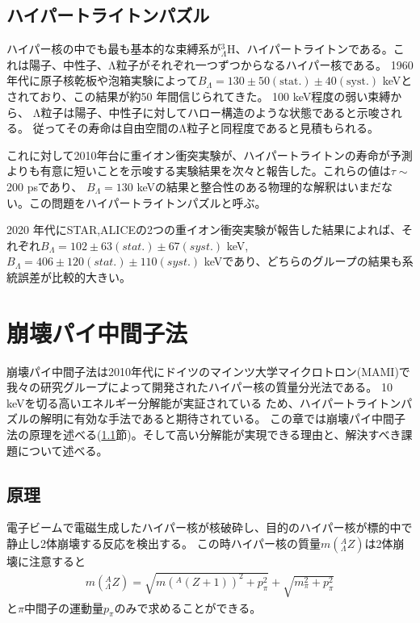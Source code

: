 \documentclass[a4paper,11pt,uplatex]{jsbook}
\begin{document}
\subsection{ハイパートライトンパズル}\label{sec:hypertriton puzzle}
ハイパー核の中でも最も基本的な束縛系が$^3_{\Lambda}\text{H}$、ハイパートライトンである。これは陽子、中性子、Λ粒子がそれぞれ一つずつからなるハイパー核である。
1960年代に原子核乾板や泡箱実験によって$B_{\Lambda} = 130 \pm 50(\text{stat.}) \pm 40(\text{syst.})$ keVとされており\cite{Juric}、この結果が約50 年間信じられてきた。
100 keV程度の弱い束縛から、%
Λ粒子は陽子、中性子に対してハロー構造のような状態であると示唆される。%
従ってその寿命は自由空間のΛ粒子と同程度であると見積もられる。

これに対して2010年台に重イオン衝突実験が、ハイパートライトンの寿命が予測よりも有意に短いことを示唆する実験結果を次々と報告した\cite{HI-1,HI-2,HI-3,HI-4}。これらの値は$\tau \sim$200 psであり、
$B_{\Lambda} = 130$ keVの結果と整合性のある物理的な解釈はいまだない。この問題をハイパートライトンパズルと呼ぶ。

2020 年代にSTAR,ALICEの2つの重イオン衝突実験が報告した結果によれば、それぞれ$B_{\Lambda}= 102 \pm 63(stat.) \pm 67(syst.)$ keV\cite{STAR}, 
$B_{\Lambda} = 406 \pm 120(stat.) \pm 110 (syst.)$ keV\cite{ALICE}であり、どちらのグループの結果も系統誤差が比較的大きい。\\

\section{崩壊パイ中間子法}
崩壊パイ中間子法は2010年代にドイツのマインツ大学マイクロトロン(MAMI)で我々の研究グループによって開発されたハイパー核の質量分光法である\cite{esserObservation4Hyperhydrogen2015}。
10 keVを切る高いエネルギー分解能が実証されている\cite{Schulz2015} ため、ハイパートライトンパズルの解明に有効な手法であると期待されている。
この章では崩壊パイ中間子法の原理を述べる(\ref{sec:dps principle}節)。そして高い分解能が実現できる理由と、解決すべき課題について述べる。
\subsection{原理}\label{sec:dps principle}
電子ビームで電磁生成したハイパー核が核破砕し、目的のハイパー核が標的中で静止し2体崩壊する反応を検出する。
この時ハイパー核の質量$m(^A_{\Lambda}Z)$は2体崩壊に注意すると
\begin{eqnarray}
  m(^A_{\Lambda}Z) = \sqrt{m(^A(Z+1))^2 + p^2_\pi} + \sqrt{m_\pi^2 + p_\pi^2} \label{mass formula}
\end{eqnarray}
と$\pi$中間子の運動量$p_\pi$のみで求めることができる。
\end{document}
